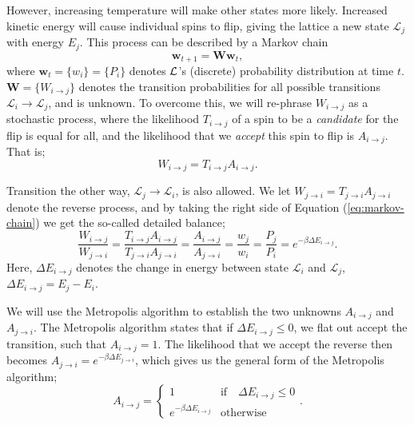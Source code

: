 \documentclass[]{article}
\begin{document}
However, increasing temperature will make other states more likely. Increased kinetic energy will cause individual spins to flip, giving the lattice a new state $\mathcal{L}_j$ with energy $E_j$. This process can be described by a Markov chain
\begin{equation} \label{eq:markov-chain}
	\mathbf{w}_{t+1} = \mathbf{W} \mathbf{w}_{t},
\end{equation}
where $\mathbf{w}_t = \{w_i\} = \{P_i\}$ denotes $\cal{L}$'s (discrete) probability distribution at time $t$. $\mathbf{W} = \{W_{i \rightarrow j}\}$ denotes the transition probabilities for all possible transitions $\mathcal{L}_i \rightarrow \mathcal{L}_j$, and is unknown. To overcome this, we will re-phrase $W_{i \rightarrow j}$ as a stochastic process, where the likelihood $T_{i \rightarrow j}$ of a spin to be a \textit{candidate} for the flip is equal for all, and the likelihood that we \textit{accept} this spin to flip is $A_{i \rightarrow j}$. That is;
\begin{equation}
	W_{i \rightarrow j} = T_{i \rightarrow j} A_{i \rightarrow j}.
\end{equation}

Transition the other way, $\mathcal{L}_j \rightarrow \mathcal{L}_i$, is also allowed. We let $W_{j \rightarrow i} = T_{j \rightarrow i} A_{j \rightarrow i}$ denote the reverse process, and by taking the right side of Equation (\ref{eq:markov-chain}) we get the so-called detailed balance;
\begin{equation}
	\frac{W_{i \rightarrow j}}{W_{j \rightarrow i}} 
	= \frac{T_{i \rightarrow j} A_{i \rightarrow j}}{T_{j \rightarrow i} A_{j \rightarrow i}} 
	= \frac{A_{i \rightarrow j}}{A_{j \rightarrow i}}
	= \frac{w_j}{w_i} = \frac{P_j}{P_i} = e^{-\beta \Delta E_{i \rightarrow j}}.
\end{equation}
Here, $\Delta E_{i \rightarrow j}$ denotes the change in energy between state $\mathcal{L}_i$ and $\mathcal{L}_j$, $\Delta E_{i \rightarrow j} = E_j - E_i$. 

We will use the Metropolis algorithm to establish the two unknowns $A_{i \rightarrow j}$ and $A_{j \rightarrow i}$. The Metropolis algorithm states that if $\Delta E_{i \rightarrow j} \le 0$, we flat out accept the transition, such that $A_{i \rightarrow j} = 1$. The likelihood that we accept the reverse then becomes $A_{j \rightarrow i} = e^{-\beta \Delta E_{j \rightarrow i}}$, which gives us the general form of the Metropolis algorithm;
\begin{equation} \label{eq:metropolis}
	A_{i \rightarrow j} = 
	\begin{cases}
	1 &\text{if} \quad \Delta E_{i \rightarrow j} \le 0 \\
	e^{-\beta \Delta E_{i \rightarrow j}} &\text{otherwise}
	\end{cases}.
\end{equation}
\end{document}
